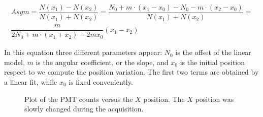 \begin{equation}
\begin{split}
Asym = \dfrac{N(x_{1}) - N(x_{2})}{N(x_{1}) + N(x_{2})} = \dfrac{N_{0} + m \cdot (x_{1} - x_{0}) - N_{0} - m \cdot (x_{2} - x_{0})}{N(x_{1}) + N(x_{2})} = \\ \dfrac{m}{2 N_{0} + m \cdot (x_{1} +  x_{2}) - 2m x_{0}}(x_{1} -  x_{2})
\end{split}
\end{equation}

In this equation three different parameters appear: $N_{0}$ is the offset of the linear model, $m$ is the angular coefficient, or the slope, and $x_{0}$ is the initial position respect to we compute the position variation. The first two terms are obtained by a linear fit, while $x_{0}$ is fixed conveniently.

\begin{figure}[hbtp]
\centering

\caption{Plot of the PMT counts versus the $X$ position. The $X$ position was slowly changed during the acquisition.}
\label{fig:SlowPosition}
\end{figure}

